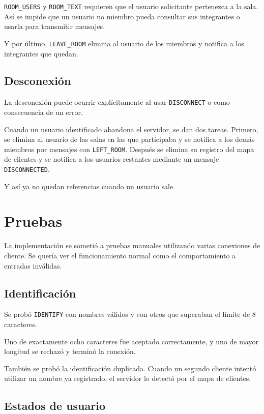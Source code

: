 \documentclass[12pt,letterpaper]{article}
\begin{document}
\texttt{ROOM\_USERS} y \texttt{ROOM\_TEXT} requieren que el usuario solicitante pertenezca a la sala. Así se impide que un usuario no
miembro pueda consultar sus integrantes o usarla para transmitir mensajes.

Y por último, \texttt{LEAVE\_ROOM} elimina al usuario de los miembros y notifica a los integrantes que quedan.

\subsection{Desconexión}

La desconexión puede ocurrir explícitamente al usar \texttt{DISCONNECT} o como consecuencia de un error.

Cuando un usuario identificado abandona el servidor, se dan dos tareas. Primero, se elimina al usuario de las salas en las que participaba y se notifica a los demás miembros por mensajes con \texttt{LEFT\_ROOM}.
Después se elimina su registro del mapa de clientes y se notifica a los
usuarios restantes mediante un mensaje \texttt{DISCONNECTED}.

Y así ya no quedan referencias cuando un usuario sale.

\section{Pruebas}

La implementación se sometió a pruebas manuales utilizando varias conexiones de cliente. Se quería ver el funcionamiento normal como el comportamiento a entradas inválidas.

\subsection{Identificación}

Se probó \texttt{IDENTIFY} con nombres válidos y con otros que superaban el límite de 8 caracteres.

Uno de exactamente ocho caracteres fue aceptado correctamente, y uno de mayor longitud se rechazó y terminó la conexión.

También se probó la identificación duplicada. Cuando un segundo cliente
intentó utilizar un nombre ya registrado, el servidor lo detectó por el mapa de clientes.

\subsection{Estados de usuario}
\end{document}
